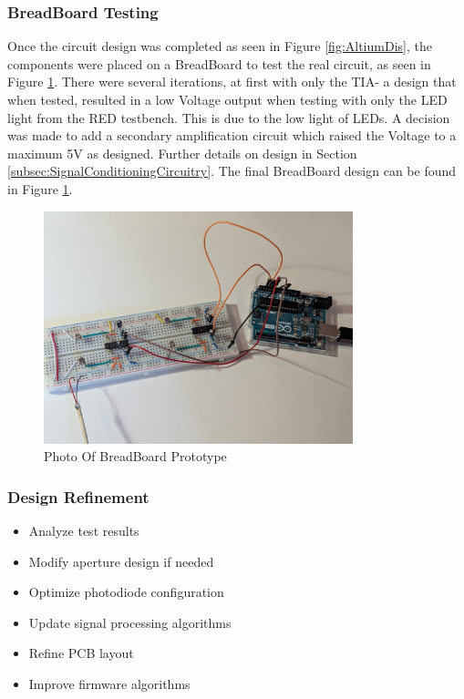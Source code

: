 %
%
\subsubsection*{BreadBoard Testing}

Once the circuit design was completed as seen in Figure  \ref{fig:AltiumDis}, the components were placed on a BreadBoard to test the real circuit, as seen in Figure \ref{fig:BreadBoardPhoto}. 
There were several iterations, at first with only the \ac{TIA}- a design that when tested, resulted in a low Voltage output when testing with only the LED light from the \ac{RED} testbench. This is due to the low light of LEDs. A decision was made to add a secondary amplification circuit which raised the Voltage to a maximum 5V as designed. Further details on design in Section \ref{subsec:SignalConditioningCircuitry}. The final BreadBoard design can be found in Figure \ref{fig:BreadBoardPhoto}.



%
\begin{figure}[htbp] %
  \centering
  \includegraphics[width=0.8\textwidth]{chapters/methodology/prototype/BreadBoardPhoto.jpg}
  \caption{Photo Of BreadBoard Prototype}
  \label{fig:BreadBoardPhoto}
\end{figure}



\subsubsection*{Design Refinement}
\begin{itemize}
  \item Analyze test results
  \item Modify aperture design if needed
  \item Optimize photodiode configuration
  \item Update signal processing algorithms
  \item Refine PCB layout
  \item Improve firmware algorithms
\end{itemize}

